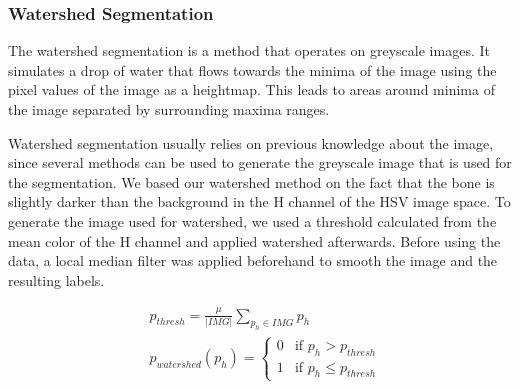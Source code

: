 \documentclass[pdftex,12pt,a4paper]{report}
\begin{document}
\subsubsection{Watershed Segmentation}
\label{subsub:segmentationwatershed}

The watershed segmentation is a method that operates on greyscale images. It simulates a drop of water that flows towards the minima of the image using the pixel values of the image as a heightmap. This leads to areas around minima of the image separated by surrounding maxima ranges.

Watershed segmentation usually relies on previous knowledge about the image, since several methods can be used to generate the greyscale image that is used for the segmentation. We based our watershed method on the fact that the bone is slightly darker than the background in the H channel of the HSV image space. To generate the image used for watershed, we used a threshold calculated from the mean color of the H channel and applied watershed afterwards. Before using the data, a local median filter was applied beforehand to smooth the image and the resulting labels.

\begin{equation}
\begin{split}
& p_{thresh} = \frac{\mu}{|IMG|} \sum_{p_h \in IMG} p_h \\
& p_{watershed}(p_h) = \begin{cases} 0 & \text{if } p_h > p_{thresh} \\ 1 & \text{if } p_h \leq p_{thresh} \end{cases}
\end{split}
\end{equation}
\end{document}
